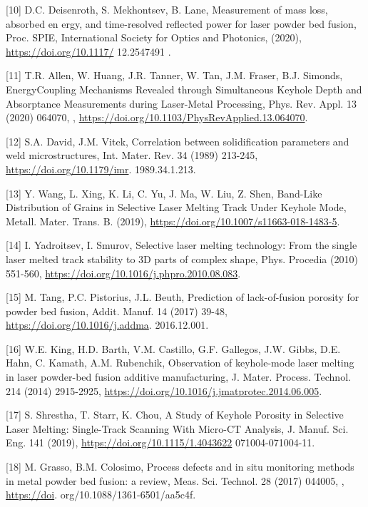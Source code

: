 \documentclass[10pt]{article}
\begin{document}
[10] D.C. Deisenroth, S. Mekhontsev, B. Lane, Measurement of mass loss, absorbed en ergy, and time-resolved reflected power for laser powder bed fusion, Proc. SPIE, International Society for Optics and Photonics, (2020), \href{https://doi.org/10.1117/}{https://doi.org/10.1117/} 12.2547491 .

[11] T.R. Allen, W. Huang, J.R. Tanner, W. Tan, J.M. Fraser, B.J. Simonds, EnergyCoupling Mechanisms Revealed through Simultaneous Keyhole Depth and Absorptance Measurements during Laser-Metal Processing, Phys. Rev. Appl. 13 (2020) 064070, , \href{https://doi.org/10.1103/PhysRevApplied.13.064070}{https://doi.org/10.1103/PhysRevApplied.13.064070}.

[12] S.A. David, J.M. Vitek, Correlation between solidification parameters and weld microstructures, Int. Mater. Rev. 34 (1989) 213-245, \href{https://doi.org/10.1179/imr}{https://doi.org/10.1179/imr}. 1989.34.1.213.

[13] Y. Wang, L. Xing, K. Li, C. Yu, J. Ma, W. Liu, Z. Shen, Band-Like Distribution of Grains in Selective Laser Melting Track Under Keyhole Mode, Metall. Mater. Trans. B. (2019), \href{https://doi.org/10.1007/s11663-018-1483-5}{https://doi.org/10.1007/s11663-018-1483-5}.

[14] I. Yadroitsev, I. Smurov, Selective laser melting technology: From the single laser melted track stability to 3D parts of complex shape, Phys. Procedia (2010) 551-560, \href{https://doi.org/10.1016/j.phpro.2010.08.083}{https://doi.org/10.1016/j.phpro.2010.08.083}.

[15] M. Tang, P.C. Pistorius, J.L. Beuth, Prediction of lack-of-fusion porosity for powder bed fusion, Addit. Manuf. 14 (2017) 39-48, \href{https://doi.org/10.1016/j.addma}{https://doi.org/10.1016/j.addma}. 2016.12.001.

[16] W.E. King, H.D. Barth, V.M. Castillo, G.F. Gallegos, J.W. Gibbs, D.E. Hahn, C. Kamath, A.M. Rubenchik, Observation of keyhole-mode laser melting in laser powder-bed fusion additive manufacturing, J. Mater. Process. Technol. 214 (2014) 2915-2925, \href{https://doi.org/10.1016/j.jmatprotec.2014.06.005}{https://doi.org/10.1016/j.jmatprotec.2014.06.005}.

[17] S. Shrestha, T. Starr, K. Chou, A Study of Keyhole Porosity in Selective Laser Melting: Single-Track Scanning With Micro-CT Analysis, J. Manuf. Sci. Eng. 141 (2019), \href{https://doi.org/10.1115/1.4043622}{https://doi.org/10.1115/1.4043622} 071004-071004-11.

[18] M. Grasso, B.M. Colosimo, Process defects and in situ monitoring methods in metal powder bed fusion: a review, Meas. Sci. Technol. 28 (2017) 044005, , \href{https://doi}{https://doi}. org/10.1088/1361-6501/aa5c4f.
\end{document}
